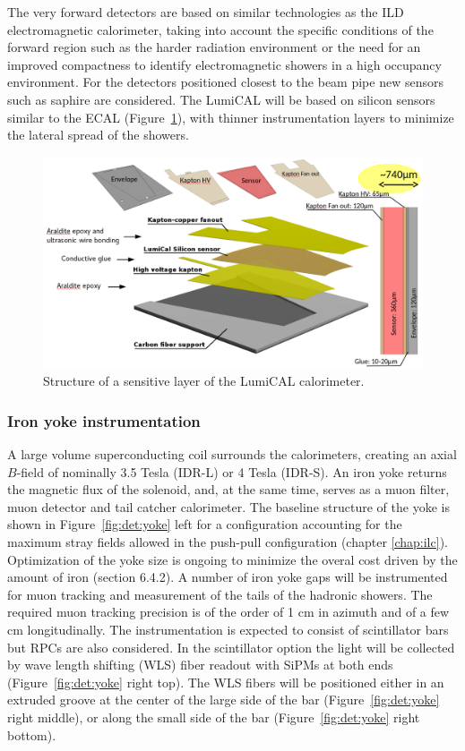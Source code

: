 The very forward detectors are based on similar technologies as the ILD electromagnetic calorimeter, taking into account the specific conditions of the forward region such as the harder radiation environment or the need for an improved compactness to identify electromagnetic showers in a high occupancy environment. For the detectors positioned closest to the beam pipe new sensors such as saphire are considered. The LumiCAL will be based on silicon sensors similar to the ECAL (Figure~\ref{fig:det:lumical}), with thinner instrumentation layers to minimize the lateral spread of the showers.     

\begin{figure}[t!]
\centering
\includegraphics[width=0.8\hsize]{Detector/fig/lumical_layer.png}
\caption{Structure of a sensitive layer of the LumiCAL calorimeter.}
\label{fig:det:lumical}
\end{figure}

\subsubsection{Iron yoke instrumentation}

A large volume superconducting coil surrounds the calorimeters, creating an axial $B$-field of nominally 3.5 Tesla (IDR-L) or 4 Tesla (IDR-S). An iron yoke returns the magnetic flux of the solenoid, and, at the same time, serves as a muon filter, muon detector and tail catcher calorimeter. The baseline structure of the yoke is shown in Figure~\ref{fig:det:yoke} left for a configuration accounting for the maximum stray fields allowed in the push-pull configuration (chapter \ref{chap:ilc}). Optimization of the yoke size is ongoing to minimize the overal cost driven by the amount of iron (section 6.4.2). A number of iron yoke gaps will be instrumented for muon tracking and measurement of the tails of the hadronic showers. The required muon tracking precision is of the order of 1 cm in azimuth and of a few cm longitudinally. The instrumentation is expected to consist of scintillator bars but RPCs are also considered. In the scintillator option the light will be collected by wave length shifting (WLS) fiber readout with SiPMs at both ends~\cite{SavelievSiPM} (Figure~\ref{fig:det:yoke} right top). The WLS fibers will be positioned either in an extruded groove at the center of the large side of the bar (Figure~\ref{fig:det:yoke} right middle), or along the small side of the bar (Figure~\ref{fig:det:yoke} right bottom).  

